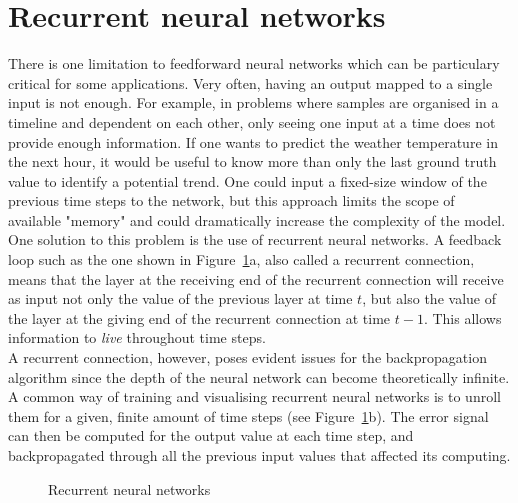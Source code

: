 \section{Recurrent neural networks}
There is one limitation to feedforward neural networks which can be particulary
critical for some applications. Very often, having an output mapped to a 
single input is not enough. For example, in problems where samples are organised
in a timeline and dependent on each other, only seeing one input at a time
does not provide enough information. If one wants to predict the weather
temperature in the next hour, it would be useful to know more than only the
last ground truth value to identify a potential trend. One 
could input a fixed-size window of the previous time steps to the network,
but this approach limits the scope of available "memory" and could dramatically
increase the complexity of the model.\\

One solution to this problem is the use of recurrent neural networks.
A feedback loop such as the one shown in Figure~\ref{fig:rnn}a, also called
a recurrent connection, means that the layer at the receiving end of the
recurrent connection will receive as input not only the value of the previous
layer at time $t$, but also the value of the layer at the giving end of the 
recurrent connection at time $t-1$. This allows information to \textit{live}
throughout time steps.\\

A recurrent connection, however, poses evident issues for the backpropagation
algorithm since the depth of the neural network can become theoretically
infinite.  A common way of training and visualising recurrent neural networks 
is to unroll them for a given, finite amount of time steps (see 
Figure~\ref{fig:rnn}b).  The error signal can then be computed
for the output value at each time step, and backpropagated through all the
previous input values that affected its computing.\\
\begin{figure}[]
	\centering
	\qquad
	\caption{Recurrent neural networks}
	\label{fig:rnn}
\end{figure}


